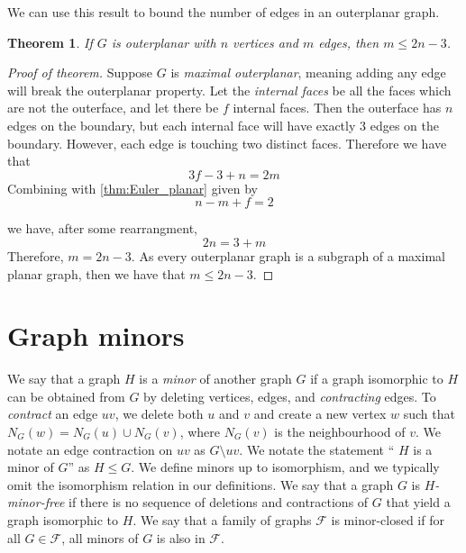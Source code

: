 \documentclass[]{report}
\newtheorem{theorem}{Theorem}
\theoremstyle{definition}
\numberwithin{theorem}{section}
\numberwithin{equation}{section}
\begin{document}
We can use this result to bound the number of edges in an outerplanar graph.
\begin{theorem}\label{thm:outerplanar_bound}
	If $G$ is outerplanar with $n$ vertices and $m$ edges, then $m \leq 2n - 3$.
\end{theorem}

\begin{proof}[Proof of theorem]
	Suppose $G$ is \textit{maximal outerplanar}, meaning adding any edge will break the outerplanar property. Let the \textit{internal faces} be all the faces which are not the outerface, and let there be $f$ internal faces. Then the outerface has $n$ edges on the boundary, but each internal face will have exactly $3$ edges on the boundary. However, each edge is touching two distinct faces. Therefore we have that
	\begin{equation}
		3 f - 3 + n = 2m
	\end{equation}
	Combining with \cref{thm:Euler_planar} given by
	\begin{equation}
		n - m + f = 2
	\end{equation}
	
	we have, after some rearrangment, 
	\begin{equation}
		2n = 3 + m
	\end{equation}
	Therefore, $m = 2n - 3$. As every outerplanar graph is a subgraph of a maximal planar graph, then we have that $m \leq 2n - 3$. 
\end{proof}
\section{Graph minors}\label{sec:Graph Minors}
We say that a graph $H$ is a \textit{minor} of another graph $G$ if a graph isomorphic to $H$ can be obtained from $G$ by deleting vertices, edges, and \textit{contracting} edges. To \textit{contract} an edge $uv$, we delete both $u$ and $v$ and create a new vertex $w$ such that $N_G(w) = N_G(u) \cup N_G(v)$, where $N_G(v)$ is the neighbourhood of $v$. We notate an edge contraction on $uv$ as $G\setminus uv$.
We notate the statement `` $H$ is a minor of $G$'' as $H \leq G$. 
We define minors up to isomorphism, and we typically omit the isomorphism relation in our definitions. We say that a graph $G$ is \textit{$H$-minor-free} if there is no sequence of deletions and contractions of $G$ that yield a graph isomorphic to $H$. We say that a family of graphs $\mathcal{F}$ is minor-closed if for all $G \in \mathcal{F}$, all minors of $G$ is also in $\mathcal{F}$. 
\end{document}
